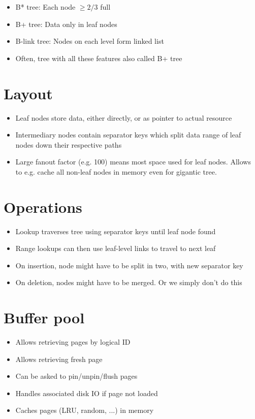 \documentclass[a4paper]{scrreprt}
\begin{document}
\begin{itemize}
		\item B* tree: Each node $\geq 2/3$ full
		\item B+ tree: Data only in leaf nodes
		\item B-link tree: Nodes on each level form linked list
		\item Often, tree with all these features also called B+ tree
\end{itemize}

\section{Layout}

\begin{itemize}
		\item Leaf nodes store data, either directly, or as pointer to actual
				resource
		\item Intermediary nodes contain separator keys which split data range
				of leaf nodes down their respective paths
		\item Large fanout factor (e.g. 100) means most space used for leaf
				nodes. Allows to e.g. cache all non-leaf nodes in memory even
				for gigantic tree.
\end{itemize}

\section{Operations}

\begin{itemize}
		\item Lookup traverses tree using separator keys until leaf node found
		\item Range lookups can then use leaf-level links to travel to next leaf
		\item On insertion, node might have to be split in two, with new separator key
		\item On deletion, nodes might have to be merged. Or we simply don't do this
\end{itemize}

\section{Buffer pool}

\begin{itemize}
		\item Allows retrieving pages by logical ID
		\item Allows retrieving fresh page
		\item Can be asked to pin/unpin/flush pages
		\item Handles associated disk IO if page not loaded
		\item Caches pages (LRU, random, ...) in memory
\end{itemize}
\end{document}
